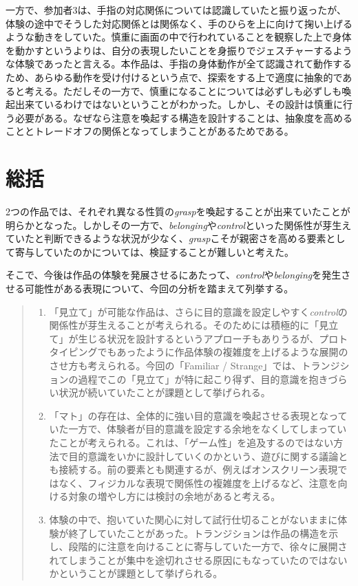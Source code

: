 一方で、参加者3は、手指の対応関係については認識していたと振り返ったが、体験の途中でそうした対応関係とは関係なく、手のひらを上に向けて掬い上げるような動きをしていた。慎重に画面の中で行われていることを観察した上で身体を動かすというよりは、自分の表現したいことを身振りでジェスチャーするような体験であったと言える。本作品は、手指の身体動作が全て認識されて動作するため、あらゆる動作を受け付けるという点で、探索をする上で適度に抽象的であると考える。ただしその一方で、慎重になることについては必ずしも必ずしも喚起出来ているわけではないということがわかった。しかし、その設計は慎重に行う必要がある。なぜなら注意を喚起する構造を設計することは、抽象度を高めることとトレードオフの関係となってしまうことがあるためである。

\section{総括}
2つの作品では、それぞれ異なる性質の\textit{grasp}を喚起することが出来ていたことが明らかとなった。しかしその一方で、\textit{belonging}や\textit{control}といった関係性が芽生えていたと判断できるような状況が少なく、\textit{grasp}こそが親密さを高める要素として寄与していたのかについては、検証することが難しいと考えた。

そこで、今後は作品の体験を発展させるにあたって、\textit{control}や\textit{belonging}を発生させる可能性がある表現について、今回の分析を踏まえて列挙する。

\begin{quote}
  \begin{enumerate}
    \item 「見立て」が可能な作品は、さらに目的意識を設定しやすく\textit{control}の関係性が芽生えることが考えられる。そのためには積極的に「見立て」が生じる状況を設計するというアプローチもありうるが、プロトタイピングでもあったように作品体験の複雑度を上げるような展開のさせ方も考えられる。今回の「Familiar / Strange」では、トランジションの過程でこの「見立て」が特に起こり得ず、目的意識を抱きづらい状況が続いていたことが課題として挙げられる。
    \item 「マト」の存在は、全体的に強い目的意識を喚起させる表現となっていた一方で、体験者が目的意識を設定する余地をなくしてしまっていたことが考えられる。これは、「ゲーム性」を追及するのではない方法で目的意識をいかに設計していくのかという、遊びに関する議論とも接続する。前の要素とも関連するが、例えばオンスクリーン表現ではなく、フィジカルな表現で関係性の複雑度を上げるなど、注意を向ける対象の増やし方には検討の余地があると考える。
    \item 体験の中で、抱いていた関心に対して試行仕切ることがないままに体験が終了していたことがあった。トランジションは作品の構造を示し、段階的に注意を向けることに寄与していた一方で、徐々に展開されてしまうことが集中を途切れさせる原因にもなっていたのではないかということが課題として挙げられる。
  \end{enumerate}
\end{quote}